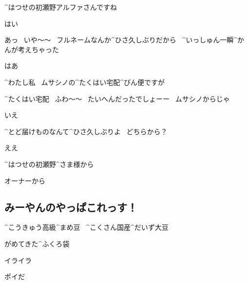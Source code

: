 \page
\K ^{はつせの}{初瀬野}アルファさんですね

\A はい

\A あっ
\ いや〜〜
\ フルネームなんか^{ひさ}{久}しぶりだから
\ ^{いっしゅん}{一瞬}^{かんが}{考}えちゃった

\K はあ

\K ^{わたし}{私}
\ ムサシノの^{たくはい}{宅配}^{びん}{便}ですが

\A ^{たくはい}{宅配}
\ ふわ〜〜
\ たいへんだったでしょーー
\ ムサシノからじゃ

\K いえ

\page
\A ^{とど}{届}けものなんて^{ひさ}{久}しぶりよ
\ どちらから？

\K ええ

\K ^{はつせの}{初瀬野}^{さま}{様}から

\A オーナーから


\subsection{みーやんのやっぱこれっす！}

\Sign ^{こうきゅう}{高級}^{まめ}{豆}
\ ^{こくさん}{国産}^{だいず}{大豆}

\Sign がめてきた^{ふくろ}{袋}

\Sign イライラ

\Sign ポイだ

